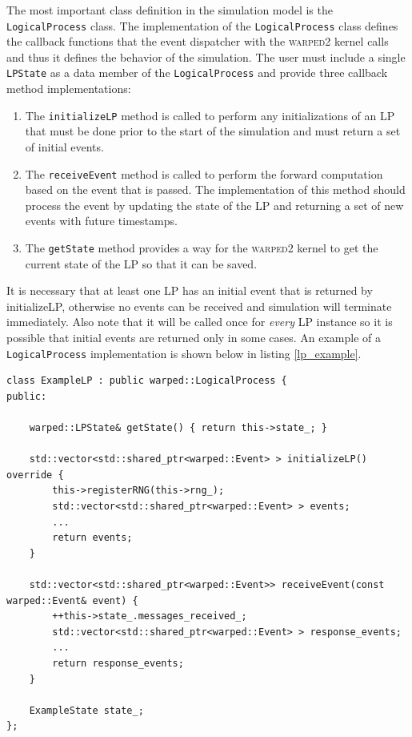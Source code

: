 \documentclass[11pt]{book}
\begin{document}
The most important class definition in the simulation model is the \texttt{LogicalProcess} class.
The implementation of the \texttt{LogicalProcess} class defines the callback functions that the
event dispatcher with the \textsc{warped2} kernel calls and thus it defines the behavior of the simulation.
The user must include a single \texttt{LPState} as a data member of the \texttt{LogicalProcess}
and provide three callback method implementations:

\begin{enumerate}
    \item The \texttt{initializeLP} method is called to perform any initializations of an LP that
        must be done prior to the start of the simulation and must return a set of initial events.
    \item The \texttt{receiveEvent} method is called to perform the forward computation based on
        the event that is passed. The implementation of this method should process the event by
        updating the state of the LP and returning a set of new events with future timestamps.
    \item The \texttt{getState} method provides a way for the \textsc{warped2} kernel to get the
        current state of the LP so that it can be saved.
\end{enumerate}

It is necessary that at least one LP has an initial event that is returned by initializeLP,
otherwise no events can be received and simulation will terminate immediately. Also note that
it will be called once for \emph{every} LP instance so it is possible that initial events
are returned only in some cases. An example of a \texttt{LogicalProcess} implementation is shown below
in listing \ref{lp_example}.

\begin{lstlisting}[caption=Example \textsc{warped2} LogicalProcess Definition, label=lp_example, float]
class ExampleLP : public warped::LogicalProcess {
public:

    warped::LPState& getState() { return this->state_; }

    std::vector<std::shared_ptr<warped::Event> > initializeLP() override {
        this->registerRNG(this->rng_);
        std::vector<std::shared_ptr<warped::Event> > events;
        ...
        return events;
    }

    std::vector<std::shared_ptr<warped::Event>> receiveEvent(const warped::Event& event) {
        ++this->state_.messages_received_;
        std::vector<std::shared_ptr<warped::Event> > response_events;
        ...
        return response_events;
    }

    ExampleState state_;
};
\end{lstlisting}
\end{document}

